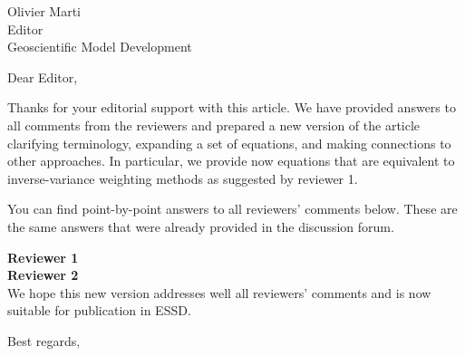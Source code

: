 \documentclass[11pt]{bgcletter}
\begin{document}
\begin{letter}{Olivier Marti \\Editor \\
   Geoscientific Model Development 
   }
\opening{Dear Editor,}
Thanks for your editorial support with this article.
We have provided answers to all comments from the reviewers and prepared a new version of the article clarifying terminology, expanding a set of equations, and making connections to other approaches. In particular, we provide now equations that are equivalent to inverse-variance weighting methods as suggested by reviewer 1. 

You can find point-by-point answers to all reviewers' comments below. These are the same answers that were already provided in the discussion forum. 

\vspace{1cm}
\textbf{Reviewer 1} \\


\vspace{1cm}
\textbf{Reviewer 2} \\


\vspace{1cm}
We hope this new version addresses well all reviewers' comments and is now suitable for publication in ESSD. 

 \closing{Best regards,}
 \end{letter}

 
\end{document}

